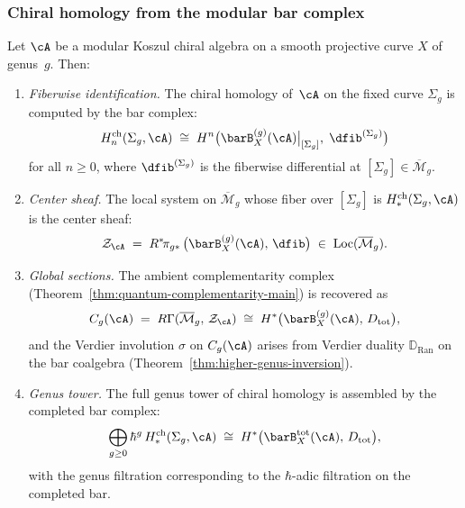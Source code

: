 \subsubsection{Chiral homology from the modular bar complex}
\label{subsubsec:chiral-homology-recovery}

\begin{theorem}\label{thm:chiral-homology-recovery}
Let $\cA$ be a modular Koszul chiral algebra on a smooth projective
curve $X$ of genus~$g$.  Then:
\begin{enumerate}[label=\textup{(\roman*)}]
\item \emph{Fiberwise identification.}
  The chiral homology of~$\cA$ on the fixed curve $\Sigma_g$ is
  computed by the bar complex:
  \begin{equation}\label{eq:chiral-homology-bar}
  H^{\mathrm{ch}}_n(\Sigma_g, \cA)
  \;\cong\;
  H^n\bigl(\barB^{(g)}_X(\cA)\big|_{[\Sigma_g]},\;
  \dfib^{(\Sigma_g)}\bigr)
  \end{equation}
  for all $n \geq 0$, where $\dfib^{(\Sigma_g)}$ is the fiberwise
  differential at $[\Sigma_g] \in \overline{\mathcal{M}}_g$.

\item \emph{Center sheaf.}
  The local system on $\overline{\mathcal{M}}_g$ whose fiber
  over $[\Sigma_g]$ is $H^{\mathrm{ch}}_*(\Sigma_g, \cA)$ is the
  center sheaf:
  \begin{equation}\label{eq:center-sheaf-bar}
  \mathcal{Z}_\cA
  \;=\;
  R^*\!\pi_{g*}\,
  \bigl(\barB^{(g)}_X(\cA),\, \dfib\bigr)
  \;\in\;
  \operatorname{Loc}(\overline{\mathcal{M}}_g).
  \end{equation}

\item \emph{Global sections.}
  The ambient complementarity complex
  \textup{(}Theorem~\textup{\ref{thm:quantum-complementarity-main})}
  is recovered as
  \begin{equation}\label{eq:ambient-from-bar}
  C_g(\cA) \;=\; R\Gamma(\overline{\mathcal{M}}_g,\,
  \mathcal{Z}_\cA)
  \;\cong\;
  H^*\bigl(\barB^{(g)}_X(\cA),\, D_{\mathrm{tot}}\bigr),
  \end{equation}
  and the Verdier involution $\sigma$ on $C_g(\cA)$ arises from
  Verdier duality $\mathbb{D}_{\operatorname{Ran}}$ on the bar
  coalgebra
  \textup{(}Theorem~\textup{\ref{thm:higher-genus-inversion})}.

\item \emph{Genus tower.}
  The full genus tower of chiral homology is assembled by the
  completed bar complex:
  \begin{equation}\label{eq:chiral-homology-tower}
  \bigoplus_{g \geq 0} \hbar^{g}\,
  H^{\mathrm{ch}}_*(\Sigma_g, \cA)
  \;\cong\;
  H^*\bigl(\barB^{\mathrm{tot}}_X(\cA),\, D_{\mathrm{tot}}\bigr),
  \end{equation}
  with the genus filtration corresponding to the $\hbar$-adic
  filtration on the completed bar.
\end{enumerate}
\end{theorem}

